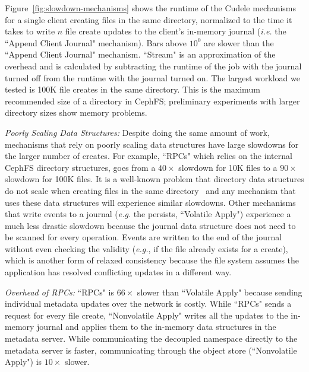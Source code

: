 Figure~\ref{fig:slowdown-mechanisms} shows the runtime of the Cudele
mechanisms for a single client creating files in the same directory, normalized
to the time it takes to write \(n\) file create updates to the client's
in-memory journal ({\it i.e.} the ``Append Client Journal" mechanism). Bars
above \(10^0\) are slower than the ``Append Client Journal" mechanism.
``Stream" is an approximation of the overhead and is calculated by subtracting
the runtime of the job with the journal turned off from the runtime with the
journal turned on.  The largest workload we tested is 100K file creates in the
same directory.  This is the maximum recommended size of a directory in CephFS;
preliminary experiments with larger directory sizes show memory problems.

{\it Poorly Scaling Data Structures:} Despite doing the same amount of
work, mechanisms that rely on poorly scaling data structures have large
slowdowns for the larger number of creates. For example, ``RPCs" which relies
on the internal CephFS directory structures, goes from a \(40\times\) slowdown
for 10K files to a \(90\times\) slowdown for 100K files. It is a well-known
problem that directory data structures do not scale when creating files in the
same directory~\cite{ren:sc2014-indexfs} and any mechanism that uses these data
structures will experience similar slowdowns. Other mechanisms that write
events to a journal ({\it e.g.} the persists, ``Volatile Apply") experience a
much less drastic slowdown because the journal data structure does not need to
be scanned for every operation. Events are written to the end of the journal without
even checking the validity ({\it e.g.}, if the file already exists for a create),
which is another form of relaxed consistency because the file system assumes the
application has resolved conflicting updates in a different way.

{\it Overhead of RPCs:} ``RPCs" is \(66\times\) slower than ``Volatile
Apply" because sending individual metadata updates over the network is costly.
While ``RPCs" sends a request for every file create, ``Nonvolatile Apply"
writes all the updates to the in-memory journal and applies them to the
in-memory data structures in the metadata server. While communicating the
decoupled namespace directly to the metadata server is faster, communicating
through the object store (``Nonvolatile Apply") is \(10\times\) slower.

